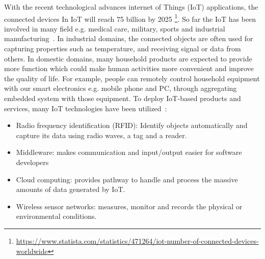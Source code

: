 


\begin{comment} %
                
                |- IoT
- Constant -----|- WSNs sensors
                |- streaming data, data analysis
                |- Embedded system
                
- Problem  -----|- power consuming, radio transmission is power-hungry

                
- goal, motive -|- motivation: try to extend the work time of the Battery-powered devices 
                |- goal: Reduce rate of transmission of through data summarization

- contribution -|- Formalize the description of original LTC algorithm
                |- Extend LTC to dimension $n$.
                |- Propose an algebraic formulation of n-dimensional LTC algorithm.
                |- Introduce an norm-independent expression of n-dimensional LTC, according 
                |  to the algebraic formulation.
                |- Internship and publish
- outline
\end{comment}


With the recent technological advances internet of Things (IoT) applications,
the connected devices In IoT will reach 75 billion by 2025
\footnote{\url{https://www.statista.com/statistics/471264/iot-number-of-connected-devices-worldwide}}.
So far the IoT has been involved in many field e.g. medical care, military,
sports and industrial manufacturing~\cite{boudargham2017exhaustive,
lai2013survey, da2014internet}. In industrial domains, the connected objects are
often used for capturing properties such as temperature, and receiving signal or
data from others. In domestic domains, many household products are expected to
provide more function which could make human activities more convenient and
improve the quality of life. For example, people can remotely control household
equipment with our smart electronics e.g. mobile phone and PC, through
aggregating embedded system with those equipment.  To deploy IoT-based products
and services, many IoT technologies have been utilized~\cite{lee2015internet}:
\begin{itemize}
    \item Radio frequency identification (RFID): Identify objects automatically and capture its data using radio waves, a tag and a reader.
    \item Middleware: makes communication and input/output easier for software
    developers
    \item Cloud computing: provides pathway to handle and process the massive amounts of data generated by IoT.
    \item Wireless sensor networks: measures, monitor and records the physical or environmental conditions.
\end{itemize}

